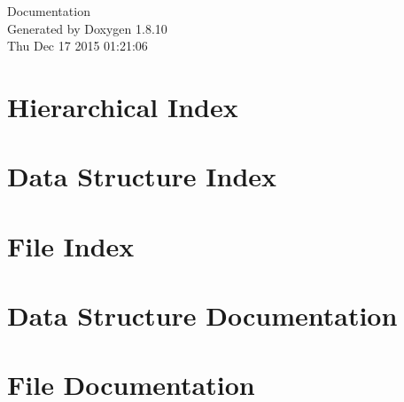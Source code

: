 \documentclass[twoside]{book}
\newcommand{\+}{\discretionary{\mbox{\scriptsize$\hookleftarrow$}}{}{}}
\newcommand{\clearemptydoublepage}{%
  \newpage{\pagestyle{empty}\cleardoublepage}%
}
\begin{document}
\hypersetup{pageanchor=false,
             bookmarks=true,
             bookmarksnumbered=true,
             pdfencoding=unicode
            }
\begin{titlepage}
\vspace*{7cm}
\begin{center}%
{\Large Documentation }\\
\vspace*{1cm}
{\large Generated by Doxygen 1.8.10}\\
\vspace*{0.5cm}
{\small Thu Dec 17 2015 01:21:06}\\
\end{center}
\end{titlepage}
\clearemptydoublepage
\tableofcontents
\clearemptydoublepage
{}
\hypersetup{pageanchor=true}

\chapter{Hierarchical Index}

\chapter{Data Structure Index}

\chapter{File Index}

\chapter{Data Structure Documentation}









\chapter{File Documentation}







































\backmatter
\newpage
{}
\clearemptydoublepage
{}
\printindex
\end{document}
